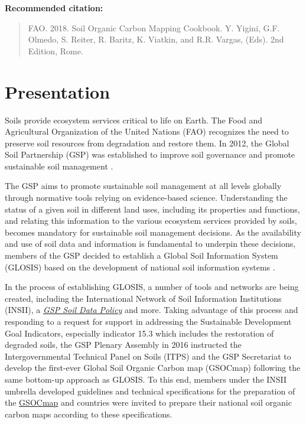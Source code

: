 \documentclass[10pt,b5paper,]{book}
\theoremstyle{definition}
\theoremstyle{definition}
\theoremstyle{definition}
\theoremstyle{remark}
\begin{document}
\vfill

\textbf{Recommended citation:}

\begin{quote}
FAO. 2018. Soil Organic Carbon Mapping Cookbook. Y. Yigini, G.F. Olmedo,
S. Reiter, R. Baritz, K. Viatkin, and R.R. Vargas, (Eds). 2nd Edition,
Rome.
\end{quote}

\mainmatter
\pagestyle{fancy}

\hypertarget{presentation}{%
\chapter{Presentation}\label{presentation}}

Soils provide ecosystem services critical to life on Earth. The Food and
Agricultural Organization of the United Nations (FAO) recognizes the
need to preserve soil resources from degradation and restore them. In
2012, the Global Soil Partnership (GSP) was established to improve soil
governance and promote sustainable soil management
.

The GSP aims to promote sustainable soil management
 at all levels globally through
normative tools relying on evidence-based science. Understanding the
status of a given soil in different land uses, including its properties
and functions, and relating this information to the various ecosystem
services provided by soils, becomes mandatory for sustainable soil
management  decisions. As the
availability and use of soil data and information is fundamental to
underpin these decisions, members of the GSP decided to establish a
Global Soil Information System (GLOSIS)
 based on the development of
national soil information systems
.

In the process of establishing GLOSIS, a number of tools and networks
are being created, including the International Network of Soil
Information Institutions (INSII), a
\href{http://www.fao.org/3/a-bs975e.pdf}{\emph{GSP Soil Data Policy}}
\citep{gsp_data_2017} and more. Taking advantage of this process and
responding to a request for support in addressing the Sustainable
Development Goal Indicators, especially indicator 15.3 which includes
the restoration of degraded soils, the GSP Plenary Assembly in 2016
instructed the Intergovernmental Technical Panel on Soils (ITPS) and the
GSP Secretariat to develop the first-ever Global Soil Organic Carbon map
(GSOCmap)  following the
same bottom-up approach as GLOSIS. To this end, members under the INSII
umbrella developed guidelines and technical specifications for the
preparation of the \href{http://www.fao.org/3/a-bp164e.pdf}{GSOCmap}
 and countries were
invited to prepare their national soil organic carbon maps according to
these specifications.
\end{document}
